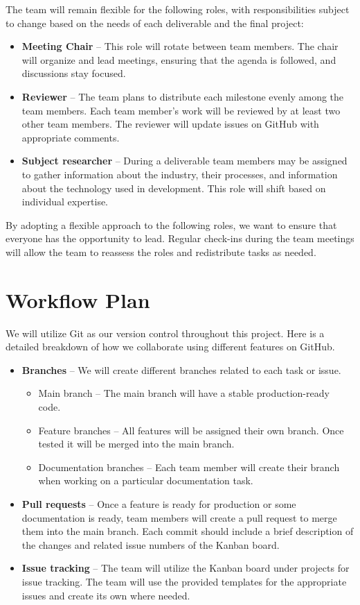 \documentclass{article}
\begin{document}
The team will remain flexible for the following roles, with responsibilities subject to change based on the needs of each deliverable and the final project:
\begin{itemize}
\item \textbf{Meeting Chair} -- This role will rotate between team members. The chair will organize and lead meetings, ensuring that the agenda is followed, and discussions stay focused.
\item \textbf{Reviewer} -- The team plans to distribute each milestone evenly among the team members. Each team member’s work will be reviewed by at least two other team members. The reviewer will update issues on GitHub with appropriate comments.
\item \textbf{Subject researcher} -- During a deliverable team members may be assigned to gather information about the industry, their processes, and information about the technology used in development. This role will shift based on individual expertise.
\end{itemize}
By adopting a flexible approach to the following roles, we want to ensure that everyone has the opportunity to lead. Regular check-ins during the team meetings will allow the team to reassess the roles and redistribute tasks as needed. 


\section{Workflow Plan}

We will utilize Git as our version control throughout this project. Here is a detailed breakdown of how we collaborate using different features on GitHub. 

\begin{itemize}
\item \textbf{Branches} -- We will create different branches related to each task or issue. 
\begin{itemize}
\item Main branch -- The main branch will have a stable production-ready code. 
\item Feature branches -- All features will be assigned their own branch. Once tested it will be merged into the main branch.
\item Documentation branches -- Each team member will create their branch when working on a particular documentation task. 
\end{itemize}

\item \textbf{Pull requests} -- Once a feature is ready for production or some documentation is ready, team members will create a pull request to merge them into the main branch. Each commit should include a brief description of the changes and related issue numbers of the Kanban board.

\item \textbf{Issue tracking} -- The team will utilize the Kanban board under projects for issue tracking. The team will use the provided templates for the appropriate issues and create its own where needed. 
\end{itemize}
\end{document}
